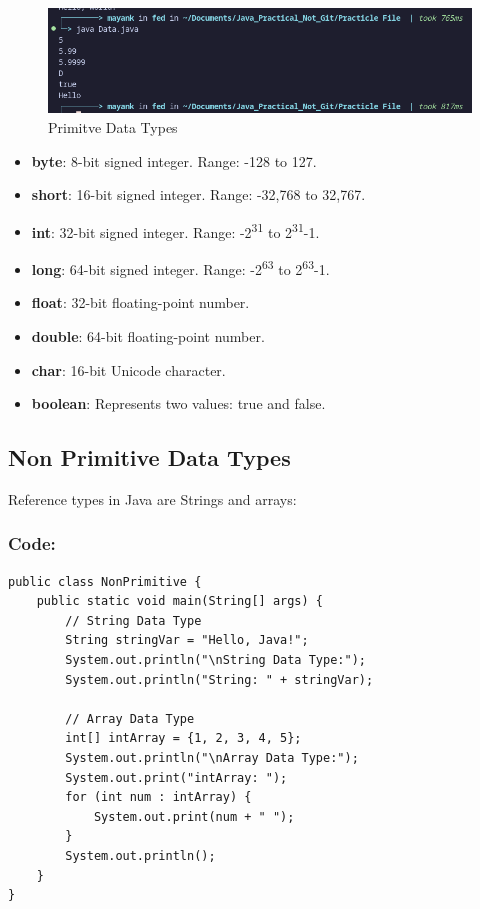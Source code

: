 \documentclass[a4paper,12pt]{article}
\begin{document}
\begin{figure}[H]
    \centering
    \includegraphics[width=0.9\linewidth]{images/DataOutput.png}
    \caption{Primitve Data Types}
    \label{fig:sample_image}
\end{figure}

\begin{itemize}[leftmargin=2cm]
    \item \textbf{byte}: 8-bit signed integer. Range: -128 to 127.
    \item \textbf{short}: 16-bit signed integer. Range: -32,768 to 32,767.
    \item \textbf{int}: 32-bit signed integer. Range: -2\textsuperscript{31} to 2\textsuperscript{31}-1.
    \item \textbf{long}: 64-bit signed integer. Range: -2\textsuperscript{63} to 2\textsuperscript{63}-1.
    \item \textbf{float}: 32-bit floating-point number.
    \item \textbf{double}: 64-bit floating-point number.
    \item \textbf{char}: 16-bit Unicode character.
    \item \textbf{boolean}: Represents two values: true and false.
\end{itemize}

\subsection{Non Primitive Data Types}
Reference types in Java are Strings and arrays:
\subsubsection{Code: }
\begin{lstlisting}
public class NonPrimitive {
    public static void main(String[] args) {
        // String Data Type
        String stringVar = "Hello, Java!";
        System.out.println("\nString Data Type:");
        System.out.println("String: " + stringVar);

        // Array Data Type
        int[] intArray = {1, 2, 3, 4, 5};
        System.out.println("\nArray Data Type:");
        System.out.print("intArray: ");
        for (int num : intArray) {
            System.out.print(num + " ");
        }
        System.out.println();
    }
}  
\end{lstlisting}
\end{document}
